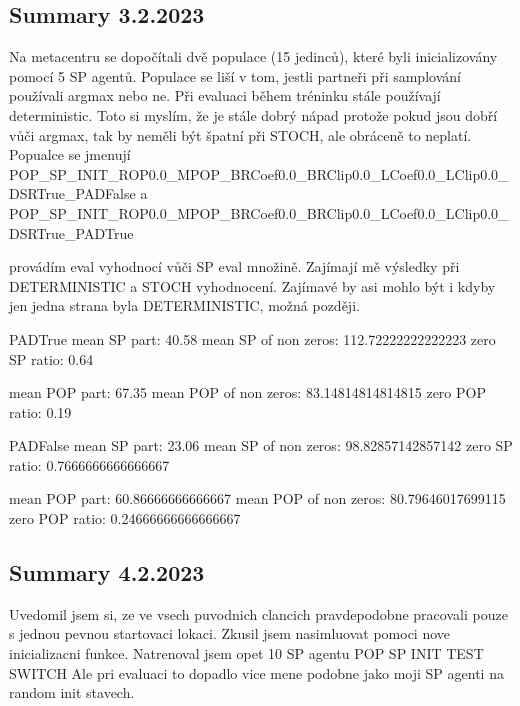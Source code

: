 \documentclass{report}
\begin{document}
\subsection{Summary 3.2.2023}
\begin{list}{}{}
    \item Na metacentru se dopočítali dvě populace (15 jedinců), které byli inicializovány pomocí 5 SP agentů. Populace se liší v tom, jestli partneři při samplování používali argmax nebo ne.
    Při evaluaci během tréninku stále používají deterministic. Toto si myslím, že je stále dobrý nápad protože pokud jsou dobří vůči argmax, tak by neměli být špatní při STOCH, ale obráceně to neplatí.
    Popualce se jmenují POP_SP_INIT_ROP0.0_MPOP_BRCoef0.0_BRClip0.0_LCoef0.0_LClip0.0_DSRTrue_PADFalse a POP_SP_INIT_ROP0.0_MPOP_BRCoef0.0_BRClip0.0_LCoef0.0_LClip0.0_DSRTrue_PADTrue
    \item provádím eval vyhodnocí vůči SP eval množině. Zajímají mě výsledky při DETERMINISTIC a STOCH vyhodnocení. Zajímavé by asi mohlo být i kdyby jen jedna strana byla DETERMINISTIC, možná později.
     
    PADTrue
    mean SP part: 40.58
    mean SP of non zeros: 112.72222222222223
    zero SP ratio: 0.64%

    mean POP part: 67.35
    mean POP of non zeros: 83.14814814814815
    zero POP ratio: 0.19%

    PADFalse
    mean SP part: 23.06
    mean SP of non zeros: 98.82857142857142
    zero SP ratio: 0.7666666666666667%

    mean POP part: 60.86666666666667
    mean POP of non zeros: 80.79646017699115
    zero POP ratio: 0.24666666666666667%

\end{list}

\subsection{Summary 4.2.2023}
\begin{list}{}{}
    \item Uvedomil jsem si, ze ve vsech puvodnich clancich pravdepodobne pracovali pouze s jednou pevnou startovaci lokaci. 
    Zkusil jsem nasimluovat pomoci nove inicializacni funkce. Natrenoval jsem opet 10 SP agentu POP SP INIT TEST SWITCH
    Ale pri evaluaci to dopadlo vice mene podobne jako moji SP agenti na random init stavech.

\end{list}
\end{document}
